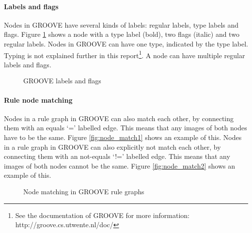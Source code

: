 \paragraph*{Labels and flags}
Nodes in GROOVE have several kinds of labels: regular labels, type labels and flags. Figure \ref{fig:flags} shows a node with a type label (bold), two flags (italic) and two regular labels. Nodes in GROOVE can have one type, indicated by the type label. Typing is not explained further in this report\footnote{See the documentation of GROOVE for more information: http://groove.cs.utwente.nl/doc/}. A node can have multiple regular labels and flags. 

\begin{figure}[h]
  \begin{center}
    
  \end{center}
  \caption{GROOVE labels and flags}
  \label{fig:flags}
\end{figure}

\paragraph*{Rule node matching}
Nodes in a rule graph in GROOVE can also match each other, by connecting them with an equals `=' labelled edge. This means that any images of both nodes have to be the same. Figure \ref{fig:node_match1} shows an example of this. Nodes in a rule graph in GROOVE can also explicitly not match each other, by connecting them with an not-equals `!=' labelled edge. This means that any images of both nodes cannot be the same. Figure \ref{fig:node_match2} shows an example of this.

\begin{figure}[h]
  \begin{center}
    \hspace{20px}
  \end{center}
  \caption{Node matching in GROOVE rule graphs}
  \label{fig:node_match}
\end{figure}

